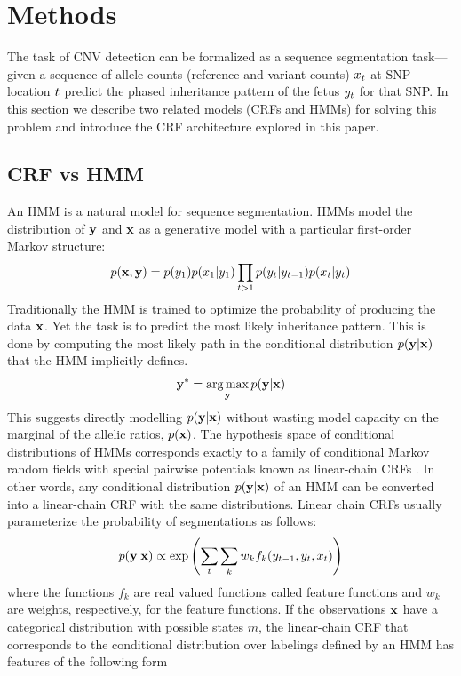 \section{Methods}
The task of CNV detection can be formalized as a sequence segmentation task---given a sequence of allele counts (reference and variant counts) $x_{t}$ at SNP location $t$ predict the phased inheritance pattern of the fetus $y_{t}$ for that SNP. In this section we describe two related models (CRFs and HMMs) for solving this problem and introduce the CRF architecture explored in this paper.

\subsection{CRF vs HMM}
An HMM is a natural model for sequence segmentation. HMMs model the distribution of $\mathbf{y}$ and $\mathbf{x}$ as a generative model with a particular first-order Markov structure:
\begin{align*}
p(\mathbf{x}, \mathbf{y}) = p(y_1) p(x_1 | y_1) \prod_{t > 1} p(y_{t} | y_{t-1})  p(x_{t} | y_{t})
\end{align*}
Traditionally the HMM is trained to optimize the probability of producing the data $\mathbf{x}$. Yet the task is to predict the most likely inheritance pattern. This is done by computing the most likely path in the conditional distribution $p(\mathbf{y} | \mathbf{x})$ that the HMM implicitly defines. 
\begin{align*}
\mathbf{y}^* = \operatorname*{arg\,max}_{\mathbf{y}} p(\mathbf{y} | \mathbf{x})
\end{align*}
This suggests directly modelling $p(\mathbf{y} | \mathbf{x})$ without wasting model capacity on the marginal of the allelic ratios, $p(\mathbf{x})$. The hypothesis space of conditional distributions of HMMs corresponds exactly to a family of conditional Markov random fields with special pairwise potentials known as linear-chain CRFs \citep{sutton2012}. In other words, any conditional distribution $p(\mathbf{y} | \mathbf{x})$ of an HMM can be converted into a linear-chain CRF with the same distributions. Linear chain CRFs usually parameterize the probability of segmentations as follows:
\begin{align*}
p(\mathbf{y} | \mathbf{x}) \propto \exp\left( \sum_{t} \sum_{k} w_k f_k(y_{t-1}, y_{t}, x_{t})\right)
\end{align*}
where the functions $f_k$ are real valued functions called feature functions and $w_k$ are weights, respectively, for the feature functions. If the observations $\mathbf{x}$ have a categorical distribution with possible states $m$, the linear-chain CRF that corresponds to the conditional distribution over labelings defined by an HMM has features of the following form
